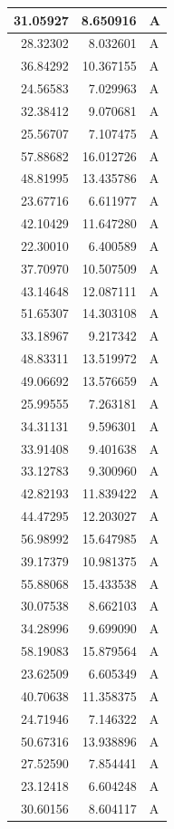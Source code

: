 \documentclass[
  letterpaper,
  DIV=11,
  numbers=noendperiod]{scrartcl}
\begin{document}
\begin{table}
\begin{tabular}[t]{r|r|l}
\hline
31.05927 & 8.650916 & A\\
\hline
28.32302 & 8.032601 & A\\
\hline
36.84292 & 10.367155 & A\\
\hline
24.56583 & 7.029963 & A\\
\hline
32.38412 & 9.070681 & A\\
\hline
25.56707 & 7.107475 & A\\
\hline
57.88682 & 16.012726 & A\\
\hline
48.81995 & 13.435786 & A\\
\hline
23.67716 & 6.611977 & A\\
\hline
42.10429 & 11.647280 & A\\
\hline
22.30010 & 6.400589 & A\\
\hline
37.70970 & 10.507509 & A\\
\hline
43.14648 & 12.087111 & A\\
\hline
51.65307 & 14.303108 & A\\
\hline
33.18967 & 9.217342 & A\\
\hline
48.83311 & 13.519972 & A\\
\hline
49.06692 & 13.576659 & A\\
\hline
25.99555 & 7.263181 & A\\
\hline
34.31131 & 9.596301 & A\\
\hline
33.91408 & 9.401638 & A\\
\hline
33.12783 & 9.300960 & A\\
\hline
42.82193 & 11.839422 & A\\
\hline
44.47295 & 12.203027 & A\\
\hline
56.98992 & 15.647985 & A\\
\hline
39.17379 & 10.981375 & A\\
\hline
55.88068 & 15.433538 & A\\
\hline
30.07538 & 8.662103 & A\\
\hline
34.28996 & 9.699090 & A\\
\hline
58.19083 & 15.879564 & A\\
\hline
23.62509 & 6.605349 & A\\
\hline
40.70638 & 11.358375 & A\\
\hline
24.71946 & 7.146322 & A\\
\hline
50.67316 & 13.938896 & A\\
\hline
27.52590 & 7.854441 & A\\
\hline
23.12418 & 6.604248 & A\\
\hline
30.60156 & 8.604117 & A\\

\end{tabular}
\end{table}
\end{document}
